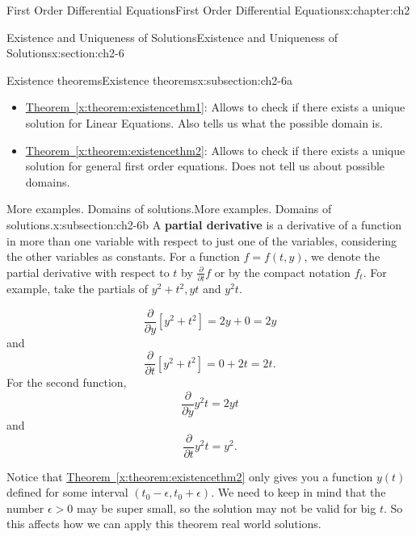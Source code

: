 \documentclass[oneside,10pt,]{book}
\newcommand{\xreffont}{\relax}
\newcommand{\terminology}[1]{\textbf{#1}}
\numberwithin{equation}{section}
\numberwithin{equation}{section}
\begin{document}
\begin{chapterptx}{First Order Differential Equations}{}{First Order Differential Equations}{}{}{x:chapter:ch2}
\begin{sectionptx}{Existence and Uniqueness of Solutions}{}{Existence and Uniqueness of Solutions}{}{}{x:section:ch2-6}
\begin{subsectionptx}{Existence theorems}{}{Existence theorems}{}{}{x:subsection:ch2-6a}
\begin{itemize}[label=\textbullet]
\item{}\hyperref[x:theorem:existencethm1]{Theorem~{\xreffont\ref{x:theorem:existencethm1}}}: Allows to check if there exists a unique solution for Linear Equations. Also tells us what the possible domain is.%
\item{}\hyperref[x:theorem:existencethm2]{Theorem~{\xreffont\ref{x:theorem:existencethm2}}}: Allows to check if there exists a unique solution for general first order equations. Does not tell us about possible domains.%
\end{itemize}
%
\end{subsectionptx}
%
%
\typeout{************************************************}
\typeout{************************************************}
%
\begin{subsectionptx}{More examples. Domains of solutions.}{}{More examples. Domains of solutions.}{}{}{x:subsection:ch2-6b}
A \terminology{partial derivative} is a derivative of a function in more than one variable with respect to just one of the variables, considering the other variables as constants. For a function \(f = f(t,y)\), we denote the partial derivative with respect to \(t\) by \(\frac{\partial}{\partial t} f\) or by the compact notation \(f_t\). For example, take the partials of \(y^{2}+t^{2},yt\) and \(y^{2}t\).%
\par
%
\begin{equation*}
\frac{\partial}{\partial y} [y^2 + t^2] = 2y + 0 = 2y
\end{equation*}
and%
\begin{equation*}
\frac{\partial}{\partial t} [y^2 + t^2] = 0 + 2t = 2t.
\end{equation*}
For the second function,%
\begin{equation*}
\frac{\partial}{\partial y} y^2 t = 2yt
\end{equation*}
and%
\begin{equation*}
\frac{\partial}{\partial t} y^2 t = y^2.
\end{equation*}
%
\par
Notice that \hyperref[x:theorem:existencethm2]{Theorem~{\xreffont\ref{x:theorem:existencethm2}}} only gives you a function \(y(t)\) defined for some interval \(\left(t_{0}-\epsilon,t_{0}+\epsilon\right)\). We need to keep in mind that the number \(\epsilon>0\) may be super small, so the solution may not be valid for big \(t\). So this affects how we can apply this theorem real world solutions.%

\end{subsectionptx}
\end{sectionptx}
\end{chapterptx}
\end{document}

